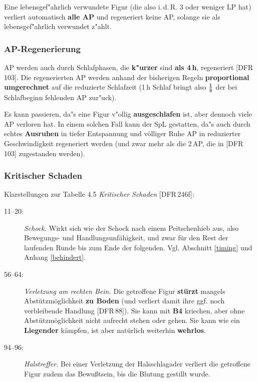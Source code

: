 \documentclass[10pt,a4paper,germanpar]{article}
\begin{document}
Eine lebensgef"ahrlich verwundete Figur (die also i.\,d.\,R. 3 oder
weniger LP hat) verliert automatisch \textbf{alle AP} und regeneriert
keine AP, solange sie als lebensgef"ahrlich verwundet z"ahlt.

\subsubsection{AP-Regenerierung}

AP werden auch durch Schlafphasen, die \textbf{k"urzer} sind
\textbf{als 4\,h}, regeneriert [DFR\,103]. Die regenerierten AP werden
anhand der bisherigen Regeln \textbf{proportional umgerechnet} auf die
reduzierte Schlafzeit (1\,h Schlaf bringt also $\frac{\sf 1}{\sf 8}$
der bei Schlafbeginn fehlenden AP zur"uck).

Es kann passieren, da"s eine Figur v"ollig \textbf{ausgeschlafen} ist,
aber dennoch viele AP verloren hat. In einem solchen Fall kann der
SpL gestatten, da"s auch durch echtes \textbf{Ausruhen} in
tiefer Entspannung und völliger Ruhe AP in reduzierter Geschwindigkeit
regeneriert werden (und zwar mehr als die 2\,AP, die in [DFR\,103]
zugestanden werden).

\subsubsection{Kritischer Schaden}

Klarstellungen zur Tabelle 4.5 \emph{Kritischer Schaden} [DFR\,246f]:

\begin{description}
\item[11--20:] \emph{Schock.} Wirkt sich wie der Schock nach einem
  Peitschenhieb aus, also Bewegungs- und Handlungsunfähigkeit, und
  zwar für den Rest der laufenden Runde bis zum Ende der
  folgenden. Vgl. Abschnitt \ref{timing} und Anhang \ref{behindert}.
\item[56--64:] \emph{Verletzung am rechten Bein.} Die getroffene Figur
  \textbf{stürzt} mangels Abstützmöglichkeit \textbf{zu Boden} (und
  verliert damit ihre ggf. noch verbleibende Handlung [DFR\,88]). Sie
  kann mit \textbf{B4} kriechen, aber ohne Abstützmöglichkeit nicht
  aufrecht stehen oder gehen. Sie kann wie ein \textbf{Liegender}
  kämpfen, ist aber natürlich weiterhin \textbf{wehrlos}.
\item[94--96:] \emph{Halstreffer.} Bei einer Verletzung der
  Halsschlagader verliert die getroffene Figur zudem das Bewußtsein,
  bis die Blutung gestillt wurde.
\end{description}
\end{document}
